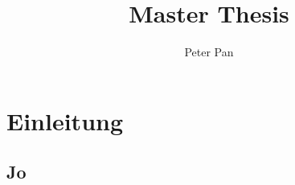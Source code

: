 \documentclass{bht-thesis}
\title{Master Thesis}
\author{Peter Pan}
\begin{document}
\cleardoublepage
{}
\maketitle
\tableofcontents
\listoffigures
\cleardoublepage
{}
\chapter{Einleitung}
\section{Jo}
\blindtext[4]

\blindtext[2]

\blindtext[3]
\end{document}
